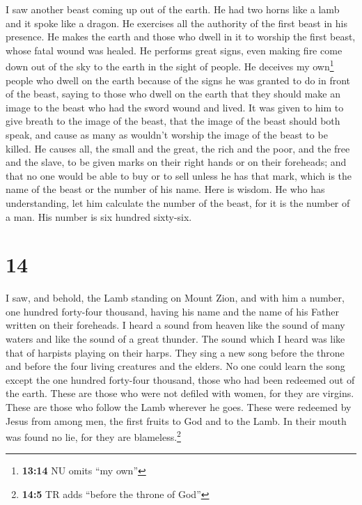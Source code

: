 I saw another beast coming up out of the earth. He had
two horns like a lamb and it spoke like a dragon.  He
exercises all the authority of the first beast in his presence. He makes
the earth and those who dwell in it to worship the first beast, whose
fatal wound was healed.  He performs great signs, even
making fire come down out of the sky to the earth in the sight of
people.  He deceives my own\footnote{\textbf{13:14} NU
  omits ``my own''} people who dwell on the earth because of the signs
he was granted to do in front of the beast, saying to those who dwell on
the earth that they should make an image to the beast who had the sword
wound and lived.  It was given to him to give breath to
the image of the beast, that the image of the beast should both speak,
and cause as many as wouldn't worship the image of the beast to be
killed.  He causes all, the small and the great, the rich
and the poor, and the free and the slave, to be given marks on their
right hands or on their foreheads;  and that no one would
be able to buy or to sell unless he has that mark, which is the name of
the beast or the number of his name.  Here is wisdom. He
who has understanding, let him calculate the number of the beast, for it
is the number of a man. His number is six hundred sixty-six.

\hypertarget{section-13}{%
\section{14}\label{section-13}}

 I saw, and behold, the Lamb standing on Mount Zion, and
with him a number, one hundred forty-four thousand, having his name and
the name of his Father written on their foreheads.  I
heard a sound from heaven like the sound of many waters and like the
sound of a great thunder. The sound which I heard was like that of
harpists playing on their harps.  They sing a new song
before the throne and before the four living creatures and the elders.
No one could learn the song except the one hundred forty-four thousand,
those who had been redeemed out of the earth.  These are
those who were not defiled with women, for they are virgins. These are
those who follow the Lamb wherever he goes. These were redeemed by Jesus
from among men, the first fruits to God and to the Lamb. 
In their mouth was found no lie, for they are blameless.\footnote{\textbf{14:5}
  TR adds ``before the throne of God''}

